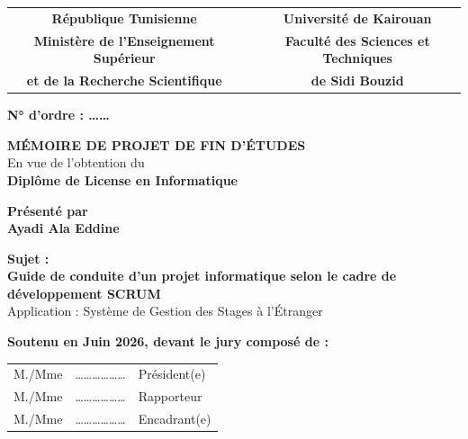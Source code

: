 \documentclass[12pt,a4paper]{report}
\begin{document}
\frontmatter

\begin{titlepage}
\begin{center}
\begin{tabular}{c c c}
\textbf{République Tunisienne} & & \textbf{Université de Kairouan} \\
\textbf{Ministère de l'Enseignement Supérieur} & & \textbf{Faculté des Sciences et Techniques} \\
\textbf{et de la Recherche Scientifique} & & \textbf{de Sidi Bouzid} \\
\end{tabular}

\vspace{1cm}

\begin{center}
\textbf{\Large N° d'ordre : \ldots\ldots}
\end{center}

\vspace{2cm}

{\Huge\bfseries MÉMOIRE DE PROJET DE FIN D'ÉTUDES\\}
\vspace{0.5cm}
{\Large En vue de l'obtention du\\}
\vspace{0.3cm}
{\LARGE\bfseries Diplôme de License en Informatique\\}

\vspace{1.5cm}

{\Large\bfseries Présenté par\\}
\vspace{0.3cm}
{\Huge\bfseries Ayadi Ala Eddine\\}

\vspace{1.5cm}

{\Large\bfseries Sujet :\\}
\vspace{0.5cm}
{\LARGE\bfseries\color{blue!80!black} Guide de conduite d'un projet informatique selon le cadre de développement SCRUM\\}
\vspace{0.3cm}
{\Large Application : Système de Gestion des Stages à l'Étranger\\}

\vspace{2cm}

{\Large\bfseries Soutenu en Juin 2026, devant le jury composé de :\\}
\vspace{0.5cm}
\begin{tabular}{l c l}
M./Mme & \ldots\ldots\ldots\ldots\ldots\ldots & Président(e) \\
M./Mme & \ldots\ldots\ldots\ldots\ldots\ldots & Rapporteur \\
M./Mme & \ldots\ldots\ldots\ldots\ldots\ldots & Encadrant(e) \\
\end{tabular}


\end{center}
\end{titlepage}
\end{document}

